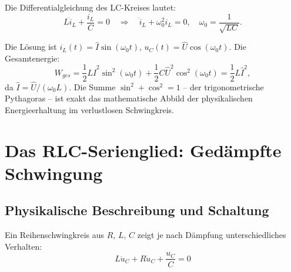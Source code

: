﻿\documentclass[12pt, a4paper]{article}
\begin{document}
	Die Differentialgleichung des LC-Kreises lautet:
	\begin{equation}
		L \ddot{i}_L + \frac{i_L}{C} = 0 \quad \Rightarrow \quad \ddot{i}_L + \omega_0^2 i_L = 0, \quad \omega_0 = \frac{1}{\sqrt{LC}}.
	\end{equation}
	
	Die Lösung ist $i_L(t) = \hat{I}\sin(\omega_0 t)$, $u_C(t) = \hat{U}\cos(\omega_0 t)$. Die Gesamtenergie:
	\begin{equation}
		W_{ges} = \frac{1}{2}L\hat{I}^2\sin^2(\omega_0 t) + \frac{1}{2}C\hat{U}^2\cos^2(\omega_0 t) = \frac{1}{2}L\hat{I}^2,
	\end{equation}
	da $\hat{I} = \hat{U}/(\omega_0 L)$. Die Summe $\sin^2 + \cos^2 = 1$ -- der trigonometrische Pythagoras -- ist exakt das mathematische Abbild der physikalischen Energieerhaltung im verlustlosen Schwingkreis.
	
	\section{Das RLC-Serienglied: Gedämpfte Schwingung}
	
	\subsection{Physikalische Beschreibung und Schaltung}
	
	Ein Reihenschwingkreis aus $R$, $L$, $C$ zeigt je nach Dämpfung unterschiedliches Verhalten:
	\begin{equation}
		L \ddot{u}_C + R \dot{u}_C + \frac{u_C}{C} = 0
	\end{equation}
	
\end{document}
